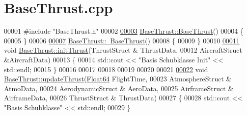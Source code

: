 \hypertarget{_base_thrust_8cpp_source}{}\section{Base\+Thrust.\+cpp}
\label{_base_thrust_8cpp_source}

\begin{DoxyCode}
00001 \textcolor{preprocessor}{#include "BaseThrust.h"}
00002 
\hyperlink{group___engine_a19885a6a70bfc4c02e2d8f310af9f22e}{00003} \hyperlink{group___engine_a19885a6a70bfc4c02e2d8f310af9f22e}{BaseThrust::BaseThrust}()
00004 \{
00005 \}
00006 
\hyperlink{group___engine_a554955351c2acfe7a46c00fe056c5c6c}{00007} \hyperlink{group___engine_a554955351c2acfe7a46c00fe056c5c6c}{BaseThrust::~BaseThrust}()
00008 \{
00009 \}
00010 
\hyperlink{group___engine_a02b3fe7f763d84c5d34b59f124eaf455}{00011} \textcolor{keywordtype}{void} \hyperlink{group___engine_a02b3fe7f763d84c5d34b59f124eaf455}{BaseThrust::initThrust}(ThrustStruct & ThrustData,
00012                             AircraftStruct &AircraftData)
00013 \{
00014     std::cout << \textcolor{stringliteral}{"Basis Schubklasse Init"} << std::endl;
00015 \}
00016 
00017 
00018 
00019 
00020 
00021 
\hyperlink{group___engine_a869359a1b2b7cddcbe5979d6a1cf5eac}{00022} \textcolor{keywordtype}{void} \hyperlink{group___engine_a869359a1b2b7cddcbe5979d6a1cf5eac}{BaseThrust::updateThrust}(\hyperlink{group___tools_ga3f1431cb9f76da10f59246d1d743dc2c}{Float64} FlightTime,
00023                             AtmosphereStruct & AtmoData,
00024                             AerodynamicStruct & AeroData,
00025                             AirframeStruct & AirframeData,
00026                             ThrustStruct & ThrustData)
00027 \{
00028     std::cout << \textcolor{stringliteral}{"Basis Schubklasse"} << std::endl;
00029 \}
\end{DoxyCode}
